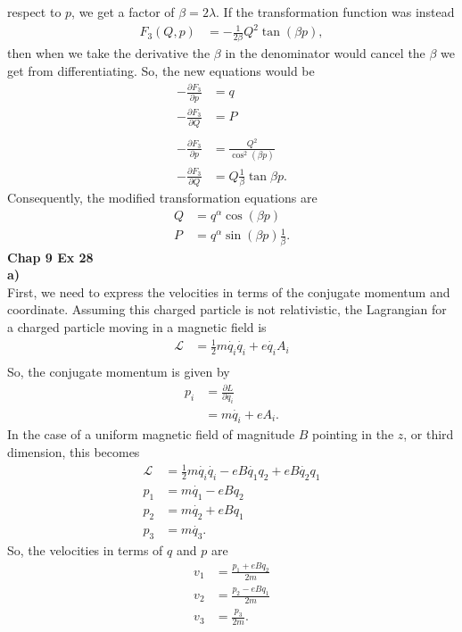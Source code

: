 \documentclass[10pt]{article}
\begin{document}
respect to $p$, we get a factor of $\beta=2\lambda$.  If the transformation 
function was instead
\begin{align*}
  F_3(Q,p) &= -\frac{1}{2\beta}Q^2\tan(\beta p),
\end{align*}
then when we take the derivative the $\beta$ in the denominator would cancel
the $\beta$ we get from differentiating.  So, the new equations would be
\begin{align*}
  -\frac{\partial F_3}{\partial p} &= q\\
  -\frac{\partial F_3}{\partial Q} &= P\\
  \\
  -\frac{\partial F_3}{\partial p} &= \frac{Q^2}{\cos^2(\beta p)}\\
  -\frac{\partial F_3}{\partial Q} &= Q\frac{1}{\beta}\tan{\beta p}.
\end{align*}
Consequently, the modified transformation equations are
\begin{align*}
  Q &= q^{\alpha}\cos(\beta p)\\
  P &= q^{\alpha}\sin(\beta p)\frac{1}{\beta}.
\end{align*}
\textbf{Chap 9 Ex 28}\\
\textbf{a)}\\
First, we need to express the velocities in terms of the conjugate momentum 
and coordinate.
Assuming this charged particle is not relativistic, the Lagrangian for a charged
particle moving in a magnetic field is
\begin{align*}
  \mathcal{L} &= \frac{1}{2}m\dot{q_i}\dot{q_i} + e\dot{q_i}A_i\\
\end{align*}
So, the conjugate momentum is given by
\begin{align*}
  p_i &= \frac{\partial L}{\partial \dot{q_i}}\\
      &= m\dot{q_i}+eA_i.
\end{align*}
In the case of a uniform magnetic field of magnitude $B$ pointing in the $z$,
or third dimension, this becomes
\begin{align*}
  \mathcal{L} &= \frac{1}{2}m\dot{q_i}\dot{q_i} - eB\dot{q_1}q_2 + eB\dot{q_2}q_1\\
  p_1 &= m\dot{q_1}-eBq_2\\
  p_2 &= m\dot{q_2}+eBq_1\\
  p_3 &= m\dot{q_3}.
\end{align*}
So, the velocities in terms of $q$ and $p$ are
\begin{align*}
  v_1 &= \frac{p_1+eBq_2}{2m}\\
  v_2 &= \frac{p_2-eBq_1}{2m}\\
  v_3 &= \frac{p_3}{2m}.
\end{align*}
\end{document}
